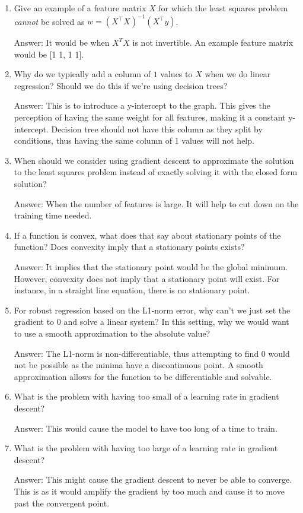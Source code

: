 \documentclass{article}
\def\ans#1{\par\gre{Answer: #1}}
\def\gre#1{{\color{gre}#1}}
\begin{document}
\begin{enumerate}
\ans{Both of the functions have the same minimas and produces the same w. The reason that 1/2 is preferred over 1/n is as it would be an easier function to calculate, given that the derivative will multiply the first value by 2.}
\item Give an example of a feature matrix $X$ for which the least squares problem \emph{cannot} be solved as $w = (X^\top X)^{-1}(X^\top y)$.
\ans{It would be when $X^T X$ is not invertible. An example feature matrix would be [1 1, 1 1].}
\item Why do we typically add a column of $1$ values to $X$ when we do linear regression? Should we do this if we're using decision trees?
\ans{This is to introduce a y-intercept to the graph. This gives the perception of having the same weight for all features, making it a constant y-intercept. Decision tree should not have this column as they split by conditions, thus having the same column of 1 values will not help.}
\item When should we consider using gradient descent to approximate the solution to the least squares problem instead of exactly solving it with the closed form solution?
\ans{When the number of features is large. It will help to cut down on the training time needed.}
\item If a function is convex, what does that say about stationary points of the function? Does convexity imply that a stationary points exists?
\ans{It implies that the stationary point would be the global minimum. However, convexity does not imply that a stationary point will exist. For instance, in a straight line equation, there is no stationary point.}
\item For robust regression based on the L1-norm error, why can't we just set the gradient to 0 and solve a linear system? In this setting, why we would want to use a smooth approximation to the absolute value?
\ans{The L1-norm is non-differentiable, thus attempting to find 0 would not be possible as the minima have a discontinuous point. A smooth approximation allows for the function to be differentiable and solvable.}
\item What is the problem with having too small of a learning rate in gradient descent?
\ans{This would cause the model to have too long of a time to train.}
\item What is the problem with having too large of a learning rate in gradient descent?
\ans{This might cause the gradient descent to never be able to converge. This is as it would amplify the gradient by too much and cause it to move past the convergent point.}
\end{enumerate}
\end{document}
